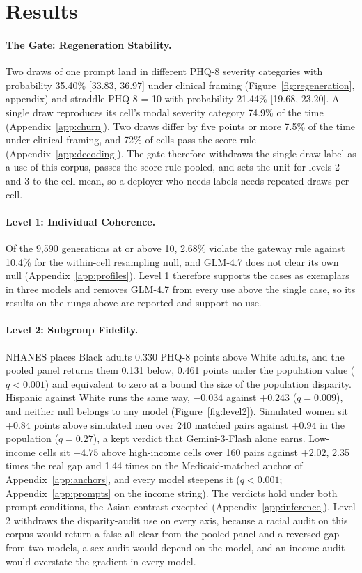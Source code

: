\documentclass[wcp]{jmlr}
\begin{document}
\section{Results}
\label{sec:results}

\paragraph{The Gate: Regeneration Stability.}
\label{sec:regeneration}
Two draws of one prompt land in different PHQ-8 severity categories with probability 35.40\% [33.83, 36.97] under clinical framing (Figure~\ref{fig:regeneration}, appendix) and straddle PHQ-8 = 10 with probability 21.44\% [19.68, 23.20]. A single draw reproduces its cell's modal severity category 74.9\% of the time (Appendix~\ref{app:churn}). Two draws differ by five points or more 7.5\% of the time under clinical framing, and 72\% of cells pass the score rule (Appendix~\ref{app:decoding}). The gate therefore withdraws the single-draw label as a use of this corpus, passes the score rule pooled, and sets the unit for levels 2 and 3 to the cell mean, so a deployer who needs labels needs repeated draws per cell.

\paragraph{Level 1: Individual Coherence.}
\label{sec:coherence}
Of the 9,590 generations at or above 10, 2.68\% violate the gateway rule against 10.4\% for the within-cell resampling null, and GLM-4.7 does not clear its own null (Appendix~\ref{app:profiles}). Level 1 therefore supports the cases as exemplars in three models and removes GLM-4.7 from every use above the single case, so its results on the rungs above are reported and support no use.

\paragraph{Level 2: Subgroup Fidelity.}
\label{sec:differential}
NHANES places Black adults 0.330 PHQ-8 points above White adults, and the pooled panel returns them 0.131 below, 0.461 points under the population value ($q < 0.001$) and equivalent to zero at a bound the size of the population disparity. Hispanic against White runs the same way, $-0.034$ against $+0.243$ ($q = 0.009$), and neither null belongs to any model (Figure~\ref{fig:level2}). Simulated women sit $+0.84$ points above simulated men over 240 matched pairs against $+0.94$ in the population ($q = 0.27$), a kept verdict that Gemini-3-Flash alone earns. Low-income cells sit $+4.75$ above high-income cells over 160 pairs against $+2.02$, 2.35 times the real gap and 1.44 times on the Medicaid-matched anchor of Appendix~\ref{app:anchors}, and every model steepens it ($q < 0.001$; Appendix~\ref{app:prompts} on the income string). The verdicts hold under both prompt conditions, the Asian contrast excepted (Appendix~\ref{app:inference}). Level 2 withdraws the disparity-audit use on every axis, because a racial audit on this corpus would return a false all-clear from the pooled panel and a reversed gap from two models, a sex audit would depend on the model, and an income audit would overstate the gradient in every model.
\end{document}
